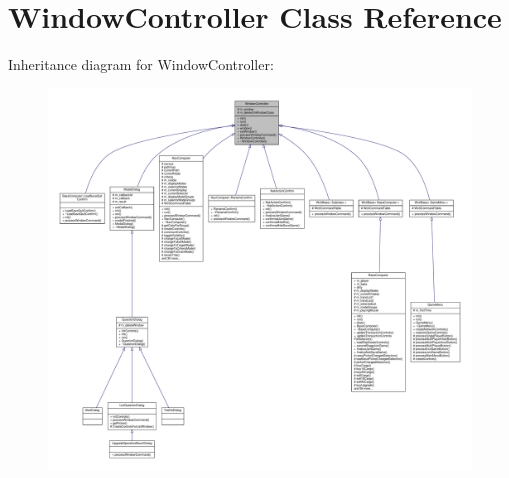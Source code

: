 \hypertarget{classWindowController}{}\section{Window\+Controller Class Reference}
\label{classWindowController}


Inheritance diagram for Window\+Controller\+:
\nopagebreak
\begin{figure}[H]
\begin{center}
\leavevmode
\includegraphics[width=350pt]{de/d82/classWindowController__inherit__graph}
\end{center}
\end{figure}


